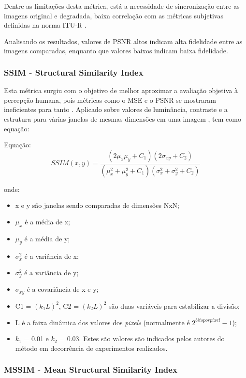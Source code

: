 Dentre as limitações desta métrica, está a necessidade de sincronização entre as imagens original e degradada, baixa correlação com as métricas subjetivas definidas na norma ITU-R \cite{emmersonsilva, itubt500}.

Analisando os resultados, valores de PSNR altos indicam alta fidelidade entre as imagens comparadas, enquanto que valores baixos indicam baixa fidelidade.

\subsubsection[SSIM]{SSIM - Structural Similarity Index}

Esta métrica surgiu com o objetivo de melhor aproximar a avaliação objetiva à percepção humana, pois métricas como o MSE e o PSNR se mostraram ineficientes para tanto \cite{emmersonsilva}. Aplicado sobre valores de luminância, contraste e a estrutura para várias janelas de mesmas dimensões em uma imagem \cite{wangbovik2004}, tem como equação:

    Equação: \[SSIM(x, y) = \frac{(2\mu_{x}\mu_{y} + C_{1})(2\sigma_{xy} + C_{2})} {(\mu_{x}^{2} + \mu_{y}^{2}+C_{1})(\sigma_{x}^{2} + \sigma_{y}^{2}+C_{2})}\]

onde:
\begin{itemize}
	\item x e y são janelas sendo comparadas de dimensões NxN;
	\item \(\mu_{x}\) é a média de x;
    \item \(\mu_{y}\) é  a média de y;
    \item \(\sigma^{2}_{x}\) é a variância de x;
    \item \(\sigma^{2}_{y}\) é a variância de y;
    \item \(\sigma_{xy}\) é a covariância de x e y;
    \item C1 = \((k_{1}L)^{2}\), C2 = \((k_{2}L)^{2}\) são duas variáveis para estabilizar a divisão;
    \item L é a faixa dinâmica dos valores dos \emph{pixels} (normalmente é \(2^{bits por pixel} - 1\));
    \item \(k_{1}\) = 0.01 e \(k_{2}\) = 0.03. Estes são valores são indicados pelos autores do método \cite{wangbovik2004} em decorrência de experimentos realizados.
\end{itemize}

\subsubsection[MSSIM]{MSSIM - Mean Structural Similarity Index}

